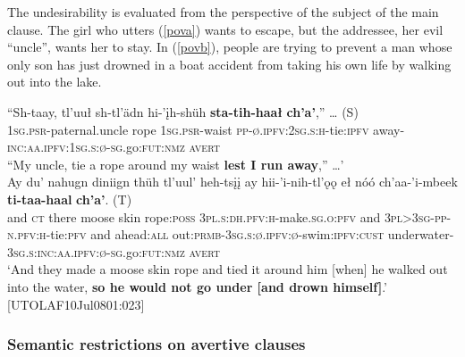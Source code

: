 \documentclass[output=paper,colorlinks,citecolor=brown]{langscibook}
\begin{document}
The undesirability is evaluated from the perspective of the subject of the main clause. The girl who utters (\ref{pova}) wants to escape, but the addressee, her evil ``uncle'', wants her to stay. In (\ref{povb}), people are trying to prevent a man whose only son has just drowned in a boat accident from taking his own life by walking out into the lake.

\begin{exe}
\ex \label{pov}
\begin{xlista}
\ex \label{pova}
\gll ``Sh-taay, tl'uuł  sh-tl'ädn hi-'įh-shüh \textbf{sta-tih-haał} \textbf{ch'a'},'' {\ldots} \textnormal{(S})\\
\textsc{1sg.psr}-paternal.uncle rope \textsc{1sg.psr}-waist \textsc{pp-ø.ipfv:2sg.s:h}-tie:\textsc{ipfv} away-\textsc{inc:aa.ipfv:1sg.s:ø-sg}.go:\textsc{fut:nmz} \textsc{avert} \\
``My uncle, tie a rope around my waist \textbf{lest I run away},'' \ldots'  \\ \hfill \citep[26]{TyoneM1996}
\ex\label{povb}
\gll Ay du' nahugn diniign thüh tl'uul' heh-tsįį ay hii-'i-nih-tl'ǫǫ eł nóó ch'aa-'i-mbeek \textbf{ti-taa-haal} \textbf{ch'a'}. \textnormal{(T)} \\
and \textsc{ct} there moose skin rope:\textsc{poss} \textsc{3pl.s:dh.pfv:h}-make.\textsc{sg.o:pfv} and \textsc{3pl>3sg-pp-n.pfv:h}-tie:\textsc{pfv} and ahead:\textsc{all}  out:\textsc{prmb-3sg.s:ø.ipfv:ø}-swim:\textsc{ipfv:cust} underwater-\textsc{3sg.s:inc:aa.ipfv:ø-sg}.go:\textsc{fut:nmz} \textsc{avert} \\
\glt `And they made a moose skin rope and tied it around him [when] he walked out into the water, \textbf{so he would not go under [and drown himself]}.' \\ \hfill [UTOLAF10Jul0801:023]
\end{xlista}
\end{exe}


\subsubsection{Semantic restrictions on avertive clauses}
\label{subsubsection:avertive-restrictions}
\end{document}
